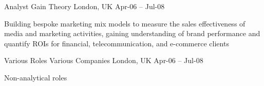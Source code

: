 \begin{cventries}
  \cventry
    {Analyst} %
    {Gain Theory} %
    {London, UK} %
    {Apr-06 – Jul-08} %
    {
      \begin{cvitems} %
        \item {Building bespoke marketing mix models to measure the sales effectiveness of media and marketing activities, gaining understanding of brand performance and quantify ROIs for financial, telecommunication, and e-commerce clients}
      \end{cvitems}
    }
    
  \cventry
    {Various Roles} %
    {Various Companies} %
    {London, UK} %
    {Apr-06 – Jul-08} %
    {
      \begin{cvitems} %
        \item {Non-analytical roles}
      \end{cvitems}
    }

\end{cventries}
